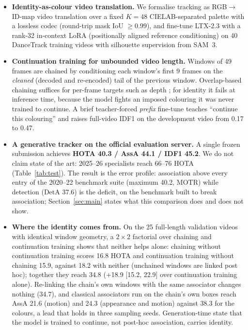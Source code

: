 \documentclass{article} %
\newcommand{\rev}[1]{{\color{blue}#1}}
\begin{document}
\begin{itemize}
\item \textbf{Identity-as-colour video translation.} We formalise tracking as RGB$\to$ID-map
video translation over a fixed $K{=}48$ CIELAB-separated palette with a lossless codec
(round-trip mask IoU $\geq 0.99$), and fine-tune LTX-2.3 with a rank-32 in-context LoRA
(positionally aligned reference conditioning) on 40 DanceTrack training videos with
silhouette supervision from SAM~3.

\item \textbf{Continuation training for unbounded video length.} Windows of 49 frames are
chained by conditioning each window's first 9 frames on the \emph{cleaned} (decoded and
re-encoded) tail of the previous window. Overlap-based chaining suffices for per-frame
targets such as depth \citep{hu2025depthcrafter}; for identity it fails at inference time,
because the model fights an imposed colouring it was never trained to continue. A brief
teacher-forced \emph{prefix} fine-tune teaches ``continue this colouring'' and raises
full-video IDF1 on the development video from 0.17 to 0.47.

\item \textbf{A generative tracker on the official evaluation server.} A single frozen
submission achieves \textbf{HOTA 40.3 / AssA 44.1 / IDF1 45.2}. We do not claim state of
the art: 2025--26 specialists reach 66--76 HOTA (Table~\ref{tab:test}). The result is the
error profile: association above every entry of the 2020--22 benchmark suite (maximum
40.2, MOTR) while detection (DetA 37.6) is the deficit, on the benchmark built to break
association; Section~\ref{sec:main} states what this comparison does and does not show.

\item \textbf{Where the identity comes from.} On the 25 full-length validation videos with
identical window geometry, \rev{a $2\times2$ factorial over chaining and continuation training
shows that neither helps alone: chaining without continuation training scores 16.8 HOTA and
continuation training without chaining 15.9, against 18.2 with neither (unchained windows
are linked post hoc); together they reach 34.8 (+18.9 [15.2, 22.9] over continuation
training alone).} Re-linking the chain's own windows with
the same associator changes nothing (34.7), and classical associators run on the chain's
own boxes reach AssA 21.6 (motion) and 24.3 (appearance and motion) against 38.3 for the
colours\rev{, a lead that holds in three sampling seeds}. Generation-time state \rev{that the
model is trained to continue}, not post-hoc association, carries identity.


\end{itemize}
\end{document}
